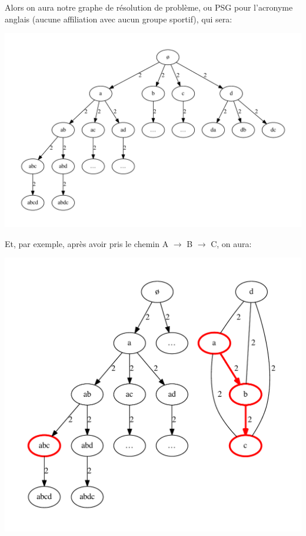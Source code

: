 \documentclass[french]{article}
\begin{document}
Alors on aura notre graphe de résolution de problème, ou PSG pour l'acronyme
anglais (aucune affiliation avec aucun groupe sportif), qui sera:
\begin{center}
\includegraphics[scale=0.5]{graphs/modeling-the-problem_example1-psg.pdf}
\end{center}

Et, par exemple, après avoir pris le chemin A $\rightarrow$ B $\rightarrow$ C,
on aura:
\begin{center}
\includegraphics[scale=0.5]{graphs/modeling-the-problem_example2.pdf}
\end{center}
\end{document}
